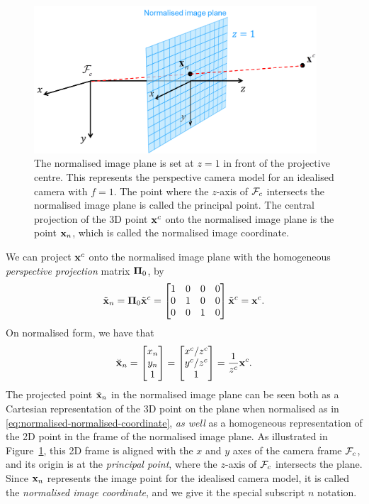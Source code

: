 \begin{figure}[htb]
    \centering
    \includegraphics[height=5.5cm]{figures/perspective-camera-model_normalised.png}
    \caption{The normalised image plane is set at $z=1$ in front of the projective centre.
    This represents the perspective camera model for an idealised camera with $f = 1$.
    The point where the $z$-axis of $\mathcal{F}_c$ intersects the normalised image plane is called the principal point.
    The central projection of the 3D point ${\boldsymbol{\mathbf{x}}}^c$ onto the normalised image plane is the point ${\boldsymbol{\mathbf{x}}}_n$, which is called the normalised image coordinate.
    }
    \label{fig:perspective-camera-model_normalised}
\end{figure}
%
We can project ${\boldsymbol{\mathbf{x}}}^c$ onto the normalised image plane with the homogeneous \emph{perspective projection} matrix ${\boldsymbol{\mathbf{\Pi}}}_0$, by
\begin{equation}
  \tilde{{\boldsymbol{\mathbf{x}}}}_n = {\boldsymbol{\mathbf{\Pi}}}_0 \tilde{{\boldsymbol{\mathbf{x}}}}^c =
  \begin{bmatrix}
    1 & 0 & 0 & 0\\
    0 & 1 & 0 & 0\\
    0 & 0 & 1 & 0
  \end{bmatrix}
  \tilde{{\boldsymbol{\mathbf{x}}}}^c = {\boldsymbol{\mathbf{x}}}^c.
\end{equation}
On normalised form, we have that
\begin{equation} \label{eq:normalised-normalised-coordinate}
  \breve{{\boldsymbol{\mathbf{x}}}}_n = 
  \begin{bmatrix}
    x_n\\
    y_n\\
    1
  \end{bmatrix} = 
  \begin{bmatrix}
    x^c / z^c\\
    y^c / z^c\\
    1
  \end{bmatrix}
  = \frac{1}{z^c}{\boldsymbol{\mathbf{x}}}^c.
\end{equation}
The projected point $\tilde{{\boldsymbol{\mathbf{x}}}}_n$ in the normalised image plane can be seen both as a Cartesian representation of the 3D point on the plane when normalised as in \eqref{eq:normalised-normalised-coordinate}, \emph{as well} as a homogeneous representation of the 2D point in the frame of the normalised image plane.
As illustrated in Figure~\ref{fig:perspective-camera-model_normalised}, this 2D frame is aligned with the $x$ and $y$ axes of the camera frame $\mathcal{F}_c$, and its origin is at the \emph{principal point}, where the $z$-axis of $\mathcal{F}_c$ intersects the plane.
Since ${\boldsymbol{\mathbf{x}}}_n$ represents the image point for the idealised camera model, it is called the \emph{normalised image coordinate}, and we give it the special subscript $n$ notation.

